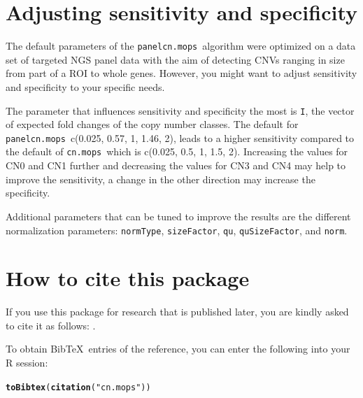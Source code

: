 \documentclass[article]{bioinf}\usepackage[]{graphicx}\usepackage[]{color}
\makeatletter
\newcommand{\hlstr}[1]{\textcolor[rgb]{0.192,0.494,0.8}{#1}}%
\newcommand{\hlstd}[1]{\textcolor[rgb]{0.345,0.345,0.345}{#1}}%
\newcommand{\hlkwd}[1]{\textcolor[rgb]{0.737,0.353,0.396}{\textbf{#1}}}%
\newenvironment{kframe}{%
 \def\at@end@of@kframe{}%
 \ifinner\ifhmode%
  \def\at@end@of@kframe{\end{minipage}}%
  \begin{minipage}{\columnwidth}%
 \fi\fi%
 \def\FrameCommand##1{\hskip\@totalleftmargin \hskip-\fboxsep
 \colorbox{shadecolor}{##1}\hskip-\fboxsep
     \hskip-\linewidth \hskip-\@totalleftmargin \hskip\columnwidth}%
 \MakeFramed {\advance\hsize-\width
   \@totalleftmargin\z@ \linewidth\hsize
   \@setminipage}}%
 {\par\unskip\endMakeFramed%
 \at@end@of@kframe}
\newenvironment{knitrout}{}{} %
\newcommand{\panelcnmops}{\texttt{panelcn.mops}}
\newcommand{\cnmops}{\texttt{cn.mops}}
\makeatother
\begin{document}
\section{Adjusting sensitivity and specificity}
The default parameters of the \panelcnmops\ algorithm were optimized on a data 
set of targeted NGS panel data with the aim of detecting CNVs ranging in size 
from part of a ROI to whole genes. However, you might want to adjust sensitivity 
and specificity to your specific needs.

The parameter that influences sensitivity and specificity the most is {\tt I}, 
the vector of expected fold changes of the copy number classes. The default for 
\panelcnmops\, c(0.025, 0.57, 1, 1.46, 2), leads to a higher sensitivity 
compared to the default of \cnmops\ which is c(0.025, 0.5, 1, 1.5, 2). 
Increasing the values for CN0 and CN1 further and decreasing the values for 
CN3 and CN4 may help to improve the sensitivity, a change in the other 
direction may increase the specificity.

Additional parameters that can be tuned to improve the results are the different 
normalization parameters: {\tt normType}, {\tt sizeFactor}, {\tt qu}, 
{\tt quSizeFactor}, and {\tt norm}.






\section{How to cite this package}

If you use this package for research that is published later, you are kindly
asked to cite it as follows:
\citep{Klambauer:11}.

To obtain Bib\TeX\ entries of the reference, you can enter the following
into your R session:
\begin{knitrout}
\color{fgcolor}\begin{kframe}
\begin{alltt}
\hlkwd{toBibtex}\hlstd{(}\hlkwd{citation}\hlstd{(}\hlstr{"cn.mops"}\hlstd{))}
\end{alltt}
\end{kframe}
\end{knitrout}




\end{document}
